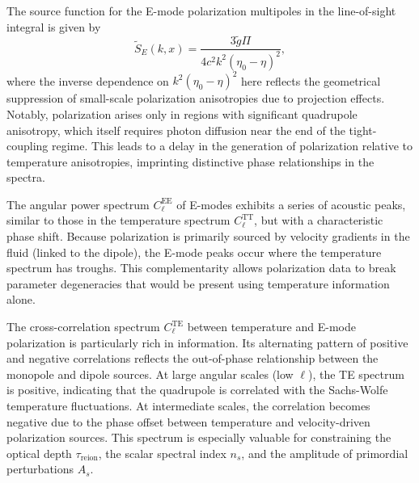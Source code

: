\documentclass{aa}
\numberwithin{equation}{section}
\numberwithin{table}{section}
\numberwithin{figure}{section}
\begin{document}
The source function for the E-mode polarization multipoles in the line-of-sight integral is given by
\begin{equation}
  \tilde{S}_E(k,x) = \frac{3\tilde{g}\Pi}{4c^2k^2(\eta_0-\eta)^2}, \label{eq: source_E}
\end{equation}
where the inverse dependence on $k^2(\eta_0 - \eta)^2$ here reflects the geometrical suppression of small-scale polarization anisotropies due to projection effects. Notably, polarization arises only in regions with significant quadrupole anisotropy, which itself requires photon diffusion near the end of the tight-coupling regime. This leads to a delay in the generation of polarization relative to temperature anisotropies, imprinting distinctive phase relationships in the spectra.

The angular power spectrum $C_\ell^{\text{EE}}$ of E-modes exhibits a series of acoustic peaks, similar to those in the temperature spectrum $C_\ell^{\text{TT}}$, but with a characteristic phase shift. Because polarization is primarily sourced by velocity gradients in the fluid (linked to the dipole), the E-mode peaks occur where the temperature spectrum has troughs. This complementarity allows polarization data to break parameter degeneracies that would be present using temperature information alone.

The cross-correlation spectrum $C_\ell^{\text{TE}}$ between temperature and E-mode polarization is particularly rich in information. Its alternating pattern of positive and negative correlations reflects the out-of-phase relationship between the monopole and dipole sources. At large angular scales (low $\ell$), the TE spectrum is positive, indicating that the quadrupole is correlated with the Sachs-Wolfe temperature fluctuations. At intermediate scales, the correlation becomes negative due to the phase offset between temperature and velocity-driven polarization sources. This spectrum is especially valuable for constraining the optical depth $\tau_{\text{reion}}$, the scalar spectral index $n_s$, and the amplitude of primordial perturbations $A_s$.
\end{document}
